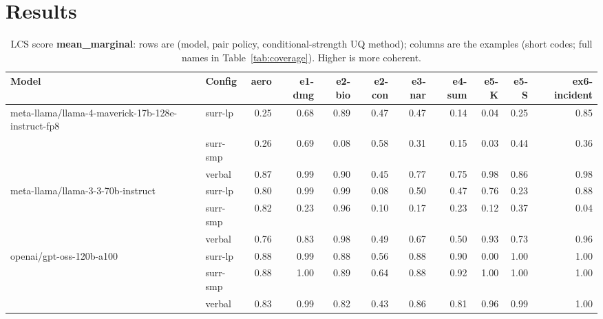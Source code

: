 \documentclass[11pt]{article}
\begin{document}
\section{Results}

\begin{table}[htbp]
\centering
\footnotesize
\setlength{\tabcolsep}{3.5pt}
\caption{LCS score \textbf{mean\_marginal}: rows are (model, pair policy, conditional-strength UQ method); columns are the examples (short codes; full names in Table~\ref{tab:coverage}). Higher is more coherent.}
\label{tab:mean-marginal}
\begin{tabular}{llrrrrrrrrr}
\toprule
\textbf{Model} & \textbf{Config} & \textbf{aero} & \textbf{e1-dmg} & \textbf{e2-bio} & \textbf{e2-con} & \textbf{e3-nar} & \textbf{e4-sum} & \textbf{e5-K} & \textbf{e5-S} & \textbf{ex6-incident} \\
\midrule
meta-llama/llama-4-maverick-17b-128e-instruct-fp8 & surr-lp & 0.25 & 0.68 & 0.89 & 0.47 & 0.47 & 0.14 & 0.04 & 0.25 & 0.85 \\
 & surr-smp & 0.26 & 0.69 & 0.08 & 0.58 & 0.31 & 0.15 & 0.03 & 0.44 & 0.36 \\
 & verbal & 0.87 & 0.99 & 0.90 & 0.45 & 0.77 & 0.75 & 0.98 & 0.86 & 0.98 \\
\midrule
meta-llama/llama-3-3-70b-instruct & surr-lp & 0.80 & 0.99 & 0.99 & 0.08 & 0.50 & 0.47 & 0.76 & 0.23 & 0.88 \\
 & surr-smp & 0.82 & 0.23 & 0.96 & 0.10 & 0.17 & 0.23 & 0.12 & 0.37 & 0.04 \\
 & verbal & 0.76 & 0.83 & 0.98 & 0.49 & 0.67 & 0.50 & 0.93 & 0.73 & 0.96 \\
\midrule
openai/gpt-oss-120b-a100 & surr-lp & 0.88 & 0.99 & 0.88 & 0.56 & 0.88 & 0.90 & 0.00 & 1.00 & 1.00 \\
 & surr-smp & 0.88 & 1.00 & 0.89 & 0.64 & 0.88 & 0.92 & 1.00 & 1.00 & 1.00 \\
 & verbal & 0.83 & 0.99 & 0.82 & 0.43 & 0.86 & 0.81 & 0.96 & 0.99 & 1.00 \\
\bottomrule
\end{tabular}
\end{table}
\end{document}
